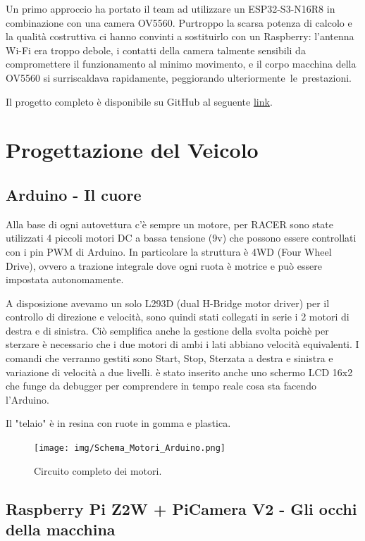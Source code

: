 \documentclass{article}
\begin{document}
    Un primo approccio ha portato il team ad utilizzare un ESP32-S3-N16R8 in combinazione con una camera OV5560. Purtroppo la scarsa potenza di calcolo e la qualità costruttiva ci hanno convinti a sostituirlo con un Raspberry: l’antenna Wi-Fi era troppo debole, i contatti della camera talmente sensibili da compromettere il funzionamento al minimo movimento, e il corpo macchina della OV5560 si surriscaldava rapidamente, peggiorando ulteriormente le prestazioni.

    Il progetto completo è disponibile su GitHub al seguente \href{https://github.com/Valerio-Cola/RACER}{link}.

\section{Progettazione del Veicolo}

\subsection{Arduino - Il cuore}

Alla base di ogni autovettura c'è sempre un motore, per RACER sono state utilizzati 4 piccoli motori DC a bassa tensione (9v) che possono essere controllati con i pin PWM di Arduino. In particolare la struttura è 4WD (Four Wheel Drive), ovvero a trazione integrale dove ogni ruota è motrice e può essere impostata autonomamente.

A disposizione avevamo un solo L293D (dual H-Bridge motor driver) per il controllo di direzione e velocità, sono quindi stati collegati in serie i 2 motori di destra e di sinistra. Ciò semplifica anche la gestione della svolta poichè per sterzare è necessario che i due motori di ambi i lati abbiano velocità equivalenti. I comandi che verranno gestiti sono Start, Stop, Sterzata a destra e sinistra e variazione di velocità a due livelli.
è stato inserito anche uno schermo LCD 16x2 che funge da debugger per comprendere in tempo reale cosa sta facendo l'Arduino.

Il "telaio" è in resina con ruote in gomma e plastica.



\begin{figure}[h!]
\centering
\texttt{[image: img/Schema\_Motori\_Arduino.png]}
\caption{Circuito completo dei motori.}
\end{figure}


\subsection{Raspberry Pi Z2W + PiCamera V2 - Gli occhi della macchina}
\end{document}
